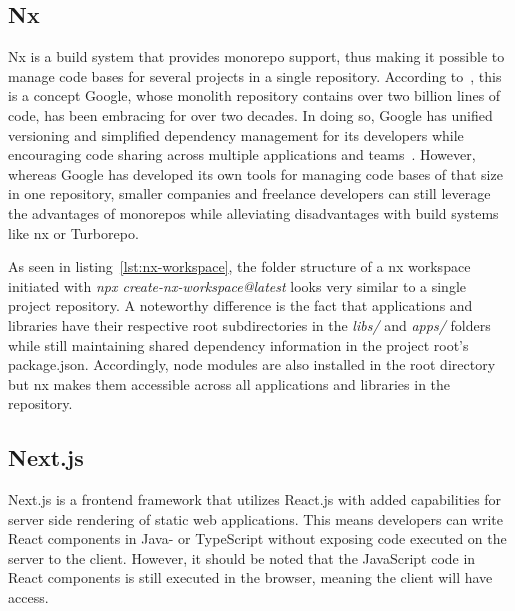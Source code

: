 \subsection{Nx}\label{subsec:nx}

Nx is a build system that provides monorepo support, thus making it possible to manage code bases for several projects in a single repository.
According to~\textcite[80]{potvin_why_2016}, this is a concept Google, whose monolith repository contains over two billion lines of code, has been embracing for over two decades.
In doing so, Google has unified versioning and simplified dependency management for its developers while encouraging code sharing across multiple applications and teams~\autocite[84]{potvin_why_2016}.
However, whereas Google has developed its own tools for managing code bases of that size in one repository, smaller companies and freelance developers can still leverage the advantages of monorepos while alleviating disadvantages with build systems like nx or Turborepo.

As seen in listing~\ref{lst:nx-workspace}, the folder structure of a nx workspace initiated with \emph{npx create-nx-workspace@latest} looks very similar to a single project repository.
A noteworthy difference is the fact that applications and libraries have their respective root subdirectories in the \emph{libs/} and \emph{apps/} folders while still maintaining shared dependency information in the project root's package.json.
Accordingly, node modules are also installed in the root directory but nx makes them accessible across all applications and libraries in the repository.


\subsection{Next.js}\label{subsec:next.js}

Next.js is a frontend framework that utilizes React.js with added capabilities for server side rendering of static web applications.
This means developers can write React components in Java- or TypeScript without exposing code executed on the server to the client.
However, it should be noted that the JavaScript code in React components is still executed in the browser, meaning the client will have access.

